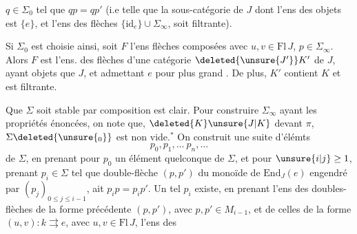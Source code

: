 $q\in\Sigma_0$ tel que $qp=qp'$ (i.e telle que la sous-catégorie  de $J$ dont l'ens des objets est $\{e\}$, et l'ens des flèches $\{\mathrm{id}_e\}\cup\Sigma_{\infty}$, soit filtrante).

Si $\Sigma_0$ est choisie ainsi, soit $F$ l'ens   flèches  composées
avec $u,v\in\mathrm{Fl}\,J$, $p\in\Sigma_{\infty}$. Alors $F$ est l'ens. des flèches d'une catégorie $\deleted{\unsure{J'}}K'$ de $J$, ayant  objets que $J$,  et admettant $e$ pour plus grand . De plus, $K'$ contient $K$ et est filtrante.

\uline{} Que $\Sigma$ soit stable par composition est clair. Pour construire $\Sigma_{\infty}$ ayant les propriétés énoncées, on note que, $\deleted{K}\unsure{J|K}$   devant $\pi$,  $\Sigma\deleted{\unsure{_0}}$ est non vide.$^*$
 On construit  une suite d'élémts
\[
p_0,p_1,\ldots\ p_n,\ldots
\]
de $\Sigma$, en prenant pour $p_0$ un élément quelconque de $\Sigma$, et pour $\unsure{i|j}\geq1$, prenant $p_i\in\Sigma$ tel que    double-flèche \deleted{\unsure{$(\alpha,\beta)$}} $(p,p')$ du monoïde  de $\mathrm{End}_J(e)$ engendré par $(p_j)_{0\leq j\leq i-1}$,  ait $p_i p=p_i p'$. Un tel $p_i$ existe,  en prenant l'ens des doubles-flèches de la forme précédente $(p,p')$, avec $p,p'\in M_{i-1}$, et de celles de la forme $(u,v):k\rightrightarrows e$, avec $u,v\in\mathrm{Fl}\,J$, l'ens des
